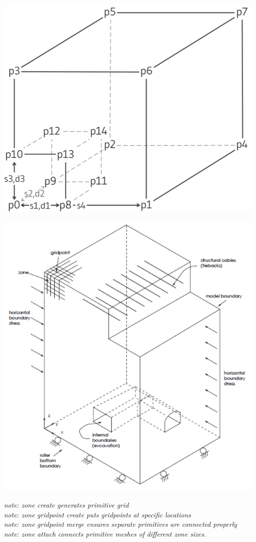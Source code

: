 \documentclass[a4paper, nobind]{templates/ociamthesis}
\begin{document}
\includegraphics[width=1\linewidth]{myfigureeeeee/radial-square}

\includegraphics[width=1\linewidth]{myfigureeeeee/example-FLAC3D-Model}

\emph{note: zone create generates primitive grid}\\
\emph{note: zone gridpoint create puts gridpoints at specific locations }\\
\emph{note: zone gridpoint merge ensures separate primitives are connected properly}\\
\emph{note: zone attach connects primitive meshes of different zone sizes.}\\
\end{document}
